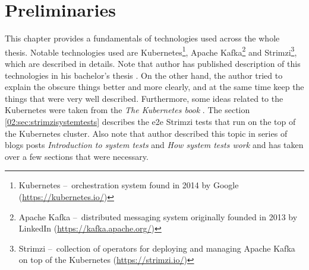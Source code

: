 \chapter{Preliminaries}

This chapter provides a fundamentals of technologies used across the whole thesis. Notable technologies used are Kubernetes\footnote{Kubernetes \---\ orchestration system found in 2014 by Google (\url{https://kubernetes.io/})}, Apache Kafka\footnote{Apache Kafka \---\ distributed messaging system originally founded in 2013 by LinkedIn (\url{https://kafka.apache.org/})} and Strimzi\footnote{Strimzi \---\ collection of operators for deploying and managing Apache Kafka on top of the Kubernetes (\url{https://strimzi.io/})}, which are described in details. Note that author has published description of this technologies in his bachelor's thesis \cite{02-bachelor-thesis}. On the other hand, the author tried to explain the obscure things better and more clearly, and at the same time keep the things that were very well described. Furthermore, some ideas related to the Kubernetes were taken from the \emph{The Kubernetes book} \cite{kubernetesBook}. The section \ref{02:sec:strimzisystemtests} describes the e2e Strimzi tests that run on the top of the Kubernetes cluster. Also note that author described this topic in series of blogs posts \emph{Introduction to system tests} \cite{02-blogpost-introduction-to-systemtest} and \emph{How system tests work} \cite{02-blogpost-how-systemtest-work} and has taken over a few sections that were necessary.